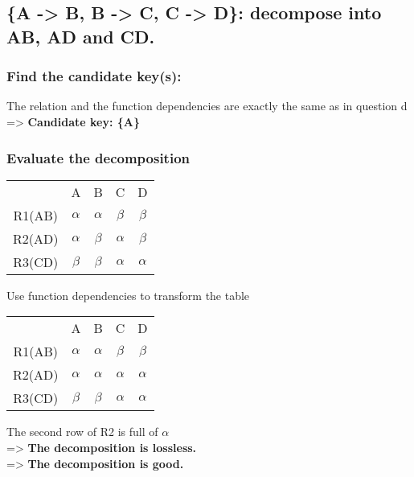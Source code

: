 \newpage
\subsection{\{A -> B, B -> C, C -> D\}: decompose into AB, AD and CD.}
\subsubsection{Find the candidate key(s):}
The relation and the function dependencies are exactly the same as in question d => 
\textbf{Candidate key: \{A\}}

\subsubsection{Evaluate the decomposition}

\begin{center}
    \begin{tabular}{c c c c c}
        \ & A & B & C & D \\
        R1(AB) & $\alpha$ &$\alpha$ & $\beta$ & $\beta$ \\
        R2(AD) & $\alpha$ &$\beta$ & $\alpha$ & $\beta$ \\
        R3(CD) & $\beta$ &$\beta$ & $\alpha$ & $\alpha$ 
    \end{tabular}
\end{center}
Use function dependencies to transform the table
\begin{center}
    \begin{tabular}{c c c c c}
        \ & A & B & C & D \\
        R1(AB) & $\alpha$ &$\alpha$ & $\beta$ & $\beta$ \\
        R2(AD) & $\alpha$ &$\alpha$ & $\alpha$ & $\alpha$ \\
        R3(CD) & $\beta$ &$\beta$ & $\alpha$ & $\alpha$ 
    \end{tabular}
\end{center}
The second row of R2 is full of $\alpha$ \\
=> \textbf{The decomposition is lossless.}\\
=> \textbf{The decomposition is good.}
